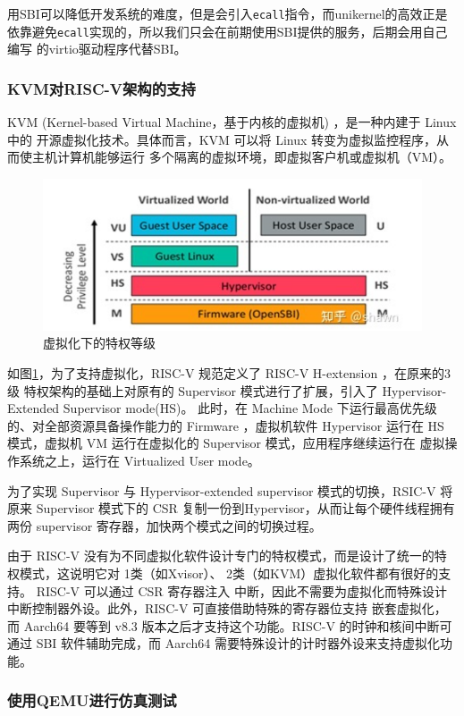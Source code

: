 \documentclass{../runikraft-report}
\begin{document}
用SBI可以降低开发系统的难度，但是会引入\texttt{ecall}指令，而unikernel的高效正是
依靠避免\texttt{ecall}实现的，所以我们只会在前期使用SBI提供的服务，后期会用自己编写
的virtio驱动程序代替SBI。


\subsubsection{KVM对RISC-V架构的支持}
KVM (Kernel-based Virtual Machine，基于内核的虚拟机)  ，是一种内建于 Linux 中的
开源虚拟化技术。具体而言，KVM 可以将 Linux 转变为虚拟监控程序，从而使主机计算机能够运行
多个隔离的虚拟环境，即虚拟客户机或虚拟机（VM）。
\begin{figure}[!hbt]
	\centering
	\includegraphics[width=0.7\linewidth]{assets/W4}
	\caption{虚拟化下的特权等级}
	\label{fig:w4}
\end{figure}

如图\ref{fig:w4}，为了支持虚拟化，RISC-V 规范定义了 RISC-V H-extension ，在原来的3级
特权架构的基础上对原有的 Supervisor 模式进行了扩展，引入了 Hypervisor-Extended Supervisor mode(HS)。
此时，在 Machine Mode 下运行最高优先级的、对全部资源具备操作能力的 Firmware ，虚拟机软件
Hypervisor 运行在 HS 模式，虚拟机 VM 运行在虚拟化的 Supervisor 模式，应用程序继续运行在
虚拟操作系统之上，运行在 Virtualized User mode。

为了实现 Supervisor 与 Hypervisor-extended supervisor 模式的切换，RSIC-V 将原来
Supervisor 模式下的 CSR 复制一份到Hypervisor，从而让每个硬件线程拥有两份 supervisor
寄存器，加快两个模式之间的切换过程。

由于 RISC-V 没有为不同虚拟化软件设计专门的特权模式，而是设计了统一的特权模式，这说明它对
1类（如Xvisor）、 2类（如KVM）虚拟化软件都有很好的支持。 RISC-V 可以通过 CSR 寄存器注入
中断，因此不需要为虚拟化而特殊设计中断控制器外设。此外，RISC-V 可直接借助特殊的寄存器位支持
嵌套虚拟化，而 Aarch64 要等到 v8.3 版本之后才支持这个功能。RISC-V 的时钟和核间中断可通过
SBI 软件辅助完成，而 Aarch64 需要特殊设计的计时器外设来支持虚拟化功能。\cite{d}

\subsubsection{使用QEMU进行仿真测试}
\end{document}
